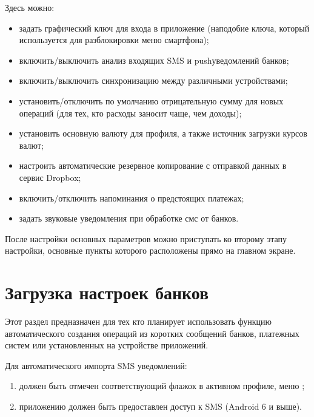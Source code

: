 \documentclass[a4paper,10pt,russian]{sphinxmanual}
\begin{document}
\sphinxAtStartPar
Здесь можно:
\begin{itemize}
\item {} 
\sphinxAtStartPar
задать графический ключ для входа в приложение (наподобие ключа, который используется для разблокировки меню смартфона);

\item {} 
\sphinxAtStartPar
включить/выключить анализ входящих SMS и push\sphinxhyphen{}уведомлений банков;

\item {} 
\sphinxAtStartPar
включить/выключить синхронизацию между различными устройствами;

\item {} 
\sphinxAtStartPar
установить/отключить по умолчанию отрицательную сумму для новых операций (для тех, кто расходы заносит чаще, чем доходы);

\item {} 
\sphinxAtStartPar
установить основную валюту для профиля, а также источник загрузки курсов валют;

\item {} 
\sphinxAtStartPar
настроить автоматические резервное копирование с отправкой данных в сервис Dropbox;

\item {} 
\sphinxAtStartPar
включить/отключить напоминания о предстоящих платежах;

\item {} 
\sphinxAtStartPar
задать звуковые уведомления при обработке смс от банков.

\end{itemize}

\sphinxAtStartPar
После настройки основных параметров можно приступать ко второму этапу настройки, основные пункты которого
расположены прямо на главном экране.


\section{Загрузка настроек банков}
\label{\detokenize{getting-started:id3}}
\sphinxAtStartPar
Этот раздел предназначен для тех кто планирует использовать функцию автоматического создания операций из коротких сообщений банков,
платежных систем или установленных на устройстве приложений.

\sphinxAtStartPar
Для автоматического импорта SMS уведомлений:
\begin{enumerate}
%
\item {} 
\sphinxAtStartPar
должен быть отмечен соответствующий флажок в активном профиле, меню ;

\item {} 
\sphinxAtStartPar
приложению должен быть предоставлен доступ к SMS (Android 6 и выше).

\end{enumerate}
\end{document}
